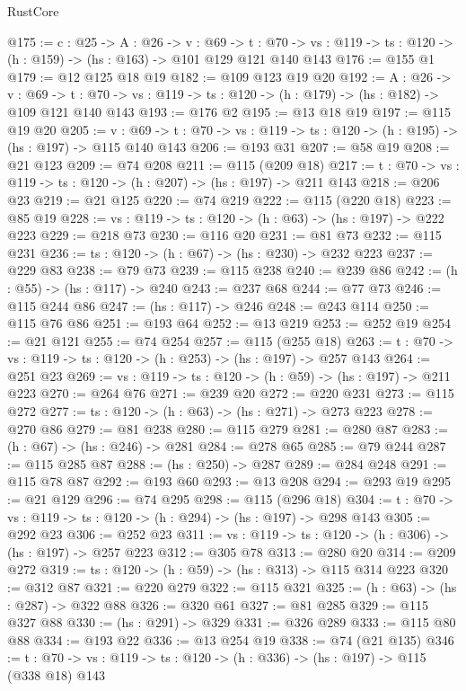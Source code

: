 \begin{lexlean}{RustCore}
\begin{coremodule}
@175 := {c : @25} ->
  {A : @26} ->
  {v : @69} ->
  {t : @70} -> {vs : @119} -> {ts : @120} -> (h : @159) -> (hs : @163) -> @101 @129 @121 @140 @143
@176 := @155 @1
@179 := @12 @125 @18 @19
@182 := @109 @123 @19 @20
@192 := {A : @26} ->
  {v : @69} ->
  {t : @70} -> {vs : @119} -> {ts : @120} -> (h : @179) -> (hs : @182) -> @109 @121 @140 @143
@193 := @176 @2
@195 := @13 @18 @19
@197 := @115 @19 @20
@205 := {v : @69} ->
  {t : @70} -> {vs : @119} -> {ts : @120} -> (h : @195) -> (hs : @197) -> @115 @140 @143
@206 := @193 @31
@207 := @58 @19
@208 := @21 @123
@209 := @74 @208
@211 := @115 (@209 @18)
@217 := {t : @70} -> {vs : @119} -> {ts : @120} -> (h : @207) -> (hs : @197) -> @211 @143
@218 := @206 @23
@219 := @21 @125
@220 := @74 @219
@222 := @115 (@220 @18)
@223 := @85 @19
@228 := {vs : @119} -> {ts : @120} -> (h : @63) -> (hs : @197) -> @222 @223
@229 := @218 @73
@230 := @116 @20
@231 := @81 @73
@232 := @115 @231
@236 := {ts : @120} -> (h : @67) -> (hs : @230) -> @232 @223
@237 := @229 @83
@238 := @79 @73
@239 := @115 @238
@240 := @239 @86
@242 := (h : @55) -> (hs : @117) -> @240
@243 := @237 @68
@244 := @77 @73
@246 := @115 @244 @86
@247 := (hs : @117) -> @246
@248 := @243 @114
@250 := @115 @76 @86
@251 := @193 @64
@252 := @13 @219
@253 := @252 @19
@254 := @21 @121
@255 := @74 @254
@257 := @115 (@255 @18)
@263 := {t : @70} -> {vs : @119} -> {ts : @120} -> (h : @253) -> (hs : @197) -> @257 @143
@264 := @251 @23
@269 := {vs : @119} -> {ts : @120} -> (h : @59) -> (hs : @197) -> @211 @223
@270 := @264 @76
@271 := @239 @20
@272 := @220 @231
@273 := @115 @272
@277 := {ts : @120} -> (h : @63) -> (hs : @271) -> @273 @223
@278 := @270 @86
@279 := @81 @238
@280 := @115 @279
@281 := @280 @87
@283 := (h : @67) -> (hs : @246) -> @281
@284 := @278 @65
@285 := @79 @244
@287 := @115 @285 @87
@288 := (hs : @250) -> @287
@289 := @284 @248
@291 := @115 @78 @87
@292 := @193 @60
@293 := @13 @208
@294 := @293 @19
@295 := @21 @129
@296 := @74 @295
@298 := @115 (@296 @18)
@304 := {t : @70} -> {vs : @119} -> {ts : @120} -> (h : @294) -> (hs : @197) -> @298 @143
@305 := @292 @23
@306 := @252 @23
@311 := {vs : @119} -> {ts : @120} -> (h : @306) -> (hs : @197) -> @257 @223
@312 := @305 @78
@313 := @280 @20
@314 := @209 @272
@319 := {ts : @120} -> (h : @59) -> (hs : @313) -> @115 @314 @223
@320 := @312 @87
@321 := @220 @279
@322 := @115 @321
@325 := (h : @63) -> (hs : @287) -> @322 @88
@326 := @320 @61
@327 := @81 @285
@329 := @115 @327 @88
@330 := (hs : @291) -> @329
@331 := @326 @289
@333 := @115 @80 @88
@334 := @193 @22
@336 := @13 @254 @19
@338 := @74 (@21 @135)
@346 := {t : @70} -> {vs : @119} -> {ts : @120} -> (h : @336) -> (hs : @197) -> @115 (@338 @18) @143

\end{coremodule}
\end{lexlean}
